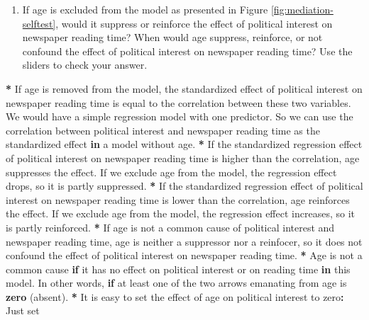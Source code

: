 \documentclass[a4paper]{book}
\newenvironment{Shaded}{\begin{snugshade}}{\end{snugshade}}
\newcommand{\KeywordTok}[1]{\textcolor[rgb]{0,0,0}{\textbf{#1}}}
\newcommand{\StringTok}[1]{\textcolor[rgb]{0.00,0.00,0.00}{#1}}
\newcommand{\ControlFlowTok}[1]{\textcolor[rgb]{0.00,0.00,0.00}{\textbf{#1}}}
\newcommand{\OperatorTok}[1]{\textcolor[rgb]{0.00,0.00,0.00}{\textbf{#1}}}
\newcommand{\NormalTok}[1]{#1}
\providecommand{\tightlist}{%
  \setlength{\itemsep}{0pt}\setlength{\parskip}{0pt}}
\theoremstyle{definition}
\theoremstyle{definition}
\theoremstyle{definition}
\theoremstyle{remark}
\begin{document}
\begin{enumerate}
\def\labelenumi{\arabic{enumi}.}
\setcounter{enumi}{1}
\tightlist
\item
  If age is excluded from the model as presented in Figure
  \ref{fig:mediation-selftest}, would it suppress or reinforce the
  effect of political interest on newspaper reading time? When would age
  suppress, reinforce, or not confound the effect of political interest
  on newspaper reading time? Use the sliders to check your answer.
\end{enumerate}

\begin{Shaded}
\begin{Highlighting}[]
\OperatorTok{*}\StringTok{ }\NormalTok{If age is removed from the model, the standardized effect of political}
\NormalTok{interest on newspaper reading time is equal to the correlation between these}
\NormalTok{two variables. We would have a simple regression model with one predictor. So}
\NormalTok{we can use the correlation between political interest and newspaper reading}
\NormalTok{time as the standardized effect }\ControlFlowTok{in}\NormalTok{ a model without age.}
\OperatorTok{*}\StringTok{ }\NormalTok{If the standardized regression effect of political interest on newspaper}
\NormalTok{reading time is higher than the correlation, age suppresses the effect. If we}
\NormalTok{exclude age from the model, the regression effect drops, so it is partly}
\NormalTok{suppressed.}
\OperatorTok{*}\StringTok{ }\NormalTok{If the standardized regression effect of political interest on newspaper}
\NormalTok{reading time is lower than the correlation, age reinforces the effect. If we}
\NormalTok{exclude age from the model, the regression effect increases, so it is partly}
\NormalTok{reinforced.}
\OperatorTok{*}\StringTok{ }\NormalTok{If age is not a common cause of political interest and newspaper reading}
\NormalTok{time, age is neither a suppressor nor a reinfocer, so it does not confound the}
\NormalTok{effect of political interest on newspaper reading time.}
\OperatorTok{*}\StringTok{ }\NormalTok{Age is not a common cause }\ControlFlowTok{if}\NormalTok{ it has no effect on political interest or on}
\NormalTok{reading time }\ControlFlowTok{in}\NormalTok{ this model. In other words, }\ControlFlowTok{if}\NormalTok{ at least one of the two arrows}
\NormalTok{emanating from age is }\KeywordTok{zero}\NormalTok{ (absent).}
\OperatorTok{*}\StringTok{ }\NormalTok{It is easy to set the effect of age on political interest to zero}\OperatorTok{:}\StringTok{ }\NormalTok{Just set}

\end{Highlighting}
\end{Shaded}
\end{document}
